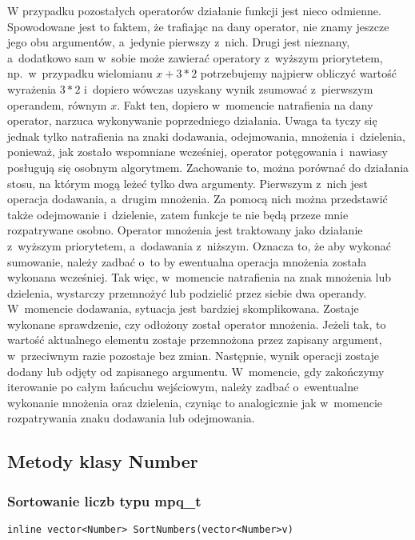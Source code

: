 W przypadku pozostałych operatorów działanie funkcji jest nieco odmienne. Spowodowane jest to faktem, że trafiając na dany operator, nie znamy jeszcze jego obu argumentów, a~jedynie pierwszy z~nich. Drugi jest nieznany, a~dodatkowo sam w~sobie może zawierać operatory z~wyższym priorytetem, np.\ w~przypadku wielomianu $x+3*2$ potrzebujemy najpierw obliczyć wartość wyrażenia $3*2$ i~dopiero wówczas uzyskany wynik zsumować z~pierwszym operandem, równym $x$. Fakt ten, dopiero w~momencie natrafienia na dany operator, narzuca wykonywanie poprzedniego działania. Uwaga ta tyczy się jednak tylko natrafienia na znaki dodawania, odejmowania, mnożenia i~dzielenia, ponieważ, jak zostało wspomniane wcześniej, operator potęgowania i~nawiasy posługują się osobnym algorytmem. Zachowanie to, można porównać do działania stosu, na którym mogą leżeć tylko dwa argumenty. Pierwszym z~nich jest operacja dodawania, a~drugim mnożenia. Za pomocą nich można przedstawić także odejmowanie i~dzielenie, zatem funkcje te nie będą przeze mnie rozpatrywane osobno. Operator mnożenia jest traktowany jako działanie z~wyższym priorytetem, a~dodawania z~niższym. Oznacza to, że aby wykonać sumowanie, należy zadbać o~to by ewentualna operacja mnożenia została wykonana wcześniej. Tak więc, w~momencie natrafienia na znak mnożenia lub dzielenia, wystarczy przemnożyć lub podzielić przez siebie dwa operandy. W~momencie dodawania, sytuacja jest bardziej skomplikowana. Zostaje wykonane sprawdzenie, czy odłożony został operator mnożenia. Jeżeli tak, to wartość aktualnego elementu zostaje przemnożona przez zapisany argument, w~przeciwnym razie pozostaje bez zmian. Następnie, wynik operacji zostaje dodany lub odjęty od zapisanego argumentu. W~momencie, gdy zakończymy iterowanie po całym łańcuchu wejściowym, należy zadbać o~ewentualne wykonanie mnożenia oraz dzielenia, czyniąc to analogicznie jak w~momencie rozpatrywania znaku dodawania lub odejmowania.

\subsection{Metody klasy Number}

\subsubsection{Sortowanie liczb typu mpq\_t}
\begin{lstlisting}
inline vector<Number> SortNumbers(vector<Number>v)
\end{lstlisting}

